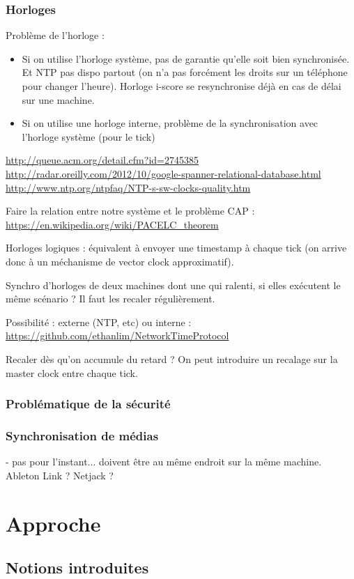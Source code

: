 \documentclass{article}
\begin{document}
\subsubsection{Horloges}
Problème de l'horloge : 
\begin{itemize}
\item Si on utilise l'horloge système, pas de garantie qu'elle soit bien synchronisée. 
Et NTP pas dispo partout (on n'a pas forcément les droits sur un téléphone pour changer l'heure).
Horloge i-score se resynchronise déjà en cas de délai sur une machine.
\item Si on utilise une horloge interne, problème de la synchronisation avec l'horloge système (pour le tick)
\end{itemize}
\url{http://queue.acm.org/detail.cfm?id=2745385}
\url{http://radar.oreilly.com/2012/10/google-spanner-relational-database.html}
\url{http://www.ntp.org/ntpfaq/NTP-s-sw-clocks-quality.htm}

Faire la relation entre notre système et le problème CAP : \url{https://en.wikipedia.org/wiki/PACELC_theorem}

Horloges logiques : équivalent à envoyer une timestamp à chaque tick (on arrive donc à un méchanisme de vector clock approximatif). 

Synchro d'horloges de deux machines dont une qui ralenti, si elles exécutent le même 
scénario ? Il faut les recaler régulièrement. 

Possibilité : externe (NTP, etc) ou interne : \url{https://github.com/ethanlim/NetworkTimeProtocol}

Recaler dès qu'on accumule du retard ?
On peut introduire un recalage sur la master clock entre chaque tick.

\subsubsection{Problématique de la sécurité}

\subsubsection{Synchronisation de médias}
- pas pour l'instant... doivent être au même endroit sur la même machine.
Ableton Link ? Netjack ?

\section{Approche}
\subsection{Notions introduites}
\end{document}
